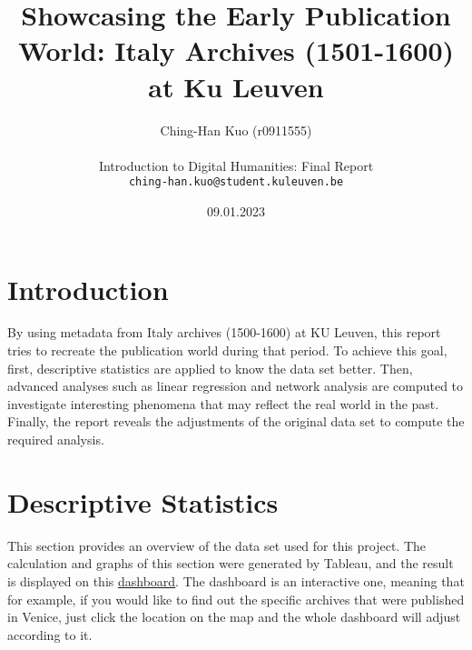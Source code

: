 \documentclass[11pt]{article}
\title{Showcasing the Early Publication World: \linebreak Italy Archives (1501-1600) at Ku Leuven}
\author{Ching-Han Kuo (r0911555) \\ \\
Introduction to Digital Humanities: Final Report \\ {\tt ching-han.kuo@student.kuleuven.be}}
\date{09.01.2023}
\begin{document}
\maketitle

\section{Introduction}
\label{Introduction}
By using metadata from Italy archives (1500-1600) at KU Leuven, this report tries to recreate the publication world during that period. To achieve this goal, first, descriptive statistics are applied to know the data set better. Then, advanced analyses such as linear regression and network analysis are computed to investigate interesting phenomena that may reflect the real world in the past. Finally, the report reveals the adjustments of the original data set to compute the required analysis.

\section{Descriptive Statistics}
\label{label:DescriptiveStatistics}
This section provides an overview of the data set used for this project. The calculation and graphs of this section were generated by Tableau, and the result is displayed on this \href{https://public.tableau.com/app/profile/dhching/viz/DH_Assignment2/ArchivesatKULeuvenItaly1501-1600}{\underline{dashboard}}. The dashboard is an interactive one, meaning that for example, if you would like to find out the specific archives that were published in Venice, just click the location on the map and the whole dashboard will adjust according to it.
\\
\end{document}
